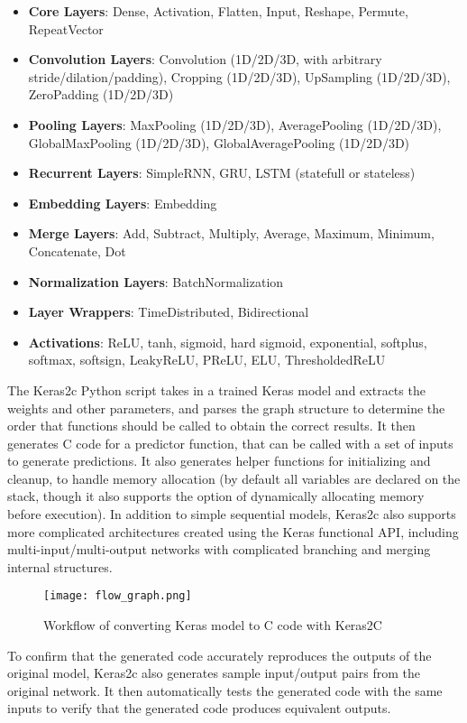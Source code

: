 \documentclass{article}
\begin{document}
\begin{itemize}
  \setlength\itemsep{0em}
\item
  \textbf{Core Layers}: Dense, Activation, Flatten, Input, Reshape, Permute, RepeatVector
\item
  \textbf{Convolution Layers}: Convolution (1D/2D/3D, with arbitrary stride/dilation/padding), Cropping (1D/2D/3D), UpSampling (1D/2D/3D), ZeroPadding (1D/2D/3D)
\item
  \textbf{Pooling Layers}: MaxPooling (1D/2D/3D), AveragePooling (1D/2D/3D), GlobalMaxPooling (1D/2D/3D), GlobalAveragePooling (1D/2D/3D)
\item
  \textbf{Recurrent Layers}: SimpleRNN, GRU, LSTM (statefull or stateless)
\item
  \textbf{Embedding Layers}: Embedding
\item
  \textbf{Merge Layers}: Add, Subtract, Multiply, Average, Maximum, Minimum, Concatenate, Dot
\item
  \textbf{Normalization Layers}: BatchNormalization
\item
  \textbf{Layer Wrappers}: TimeDistributed, Bidirectional
\item
  \textbf{Activations}: ReLU, tanh, sigmoid, hard sigmoid, exponential, softplus, softmax, softsign, LeakyReLU, PReLU, ELU, ThresholdedReLU
\end{itemize}



The Keras2c Python script takes in a trained Keras model and extracts
the weights and other parameters, and parses the graph structure to
determine the order that functions should be called to obtain the
correct results. It then generates C code for a predictor function, that
can be called with a set of inputs to generate predictions. It also
generates helper functions for initializing and cleanup, to handle
memory allocation (by default all variables are declared on the stack,
though it also supports the option of dynamically allocating memory
before execution). In addition to simple sequential models, Keras2c also
supports more complicated architectures created using the Keras
functional API, including multi-input/multi-output networks with
complicated branching and merging internal structures.
\begin{figure}[h!]
\centering
\texttt{[image: flow\_graph.png]}
\caption{Workflow of converting Keras model to C code with Keras2C}
\end{figure}

To confirm that the generated code accurately reproduces the outputs of
the original model, Keras2c also generates sample input/output pairs
from the original network. It then automatically tests the generated
code with the same inputs to verify that the generated code produces
equivalent outputs.
\end{document}

